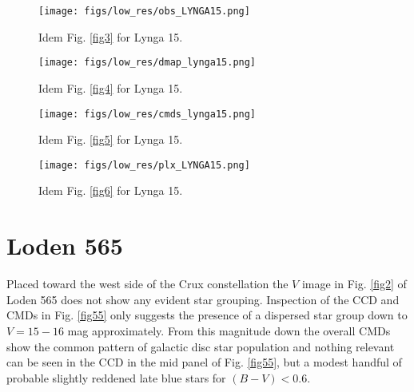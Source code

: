 \documentclass{aa}
\begin{document}
\begin{figure*}[ht]
    \centering
    \texttt{[image: figs/low\_res/obs\_LYNGA15.png]}
    \caption{Idem Fig. \ref{fig3} for Lynga 15.}
    \label{fig51}
\end{figure*}
\begin{figure*}[ht]
    \centering
    \texttt{[image: figs/low\_res/dmap\_lynga15.png]}
    \caption{Idem Fig. \ref{fig4} for Lynga 15.}
    \label{fig52}
\end{figure*}
\begin{figure*}[ht]
    \centering
    \texttt{[image: figs/low\_res/cmds\_lynga15.png]}
    \caption{Idem Fig. \ref{fig5} for Lynga 15.}
    \label{fig53}
\end{figure*}
\begin{figure*}[ht]
    \centering
    \texttt{[image: figs/low\_res/plx\_LYNGA15.png]}
    \caption{Idem Fig. \ref{fig6} for Lynga 15.}
    \label{fig54}
\end{figure*}



\section{Loden 565}

Placed toward the west side of the Crux constellation the $V$ image in Fig. 
\ref{fig2} of Loden 565 does not show any evident star grouping. Inspection of
the CCD and CMDs in Fig. \ref{fig55} only suggests the presence of a dispersed
star group down to $V = 15-16$ mag approximately. From this magnitude down the
overall CMDs show the common pattern of galactic disc star population and
nothing relevant can be seen in the CCD in the mid panel of Fig. \ref{fig55}, but
a modest handful of probable slightly reddened late blue stars for
$(B-V)<0.6$.\\
\end{document}
